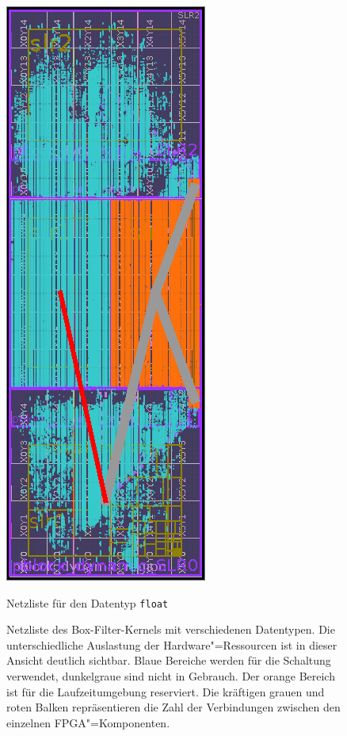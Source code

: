 \begin{figure}[htb]
\begin{minipage}{0.45\textwidth}
        \includegraphics{box_res_float.png}
        \caption*{Netzliste für den Datentyp \texttt{float}}
    \end{minipage}
    \caption[Netzliste des synthetisierten Box-Filter-\textit{Kernels} mit
             verschiedenen Datentypen]{Netzliste des Box-Filter-Kernels mit
             verschiedenen Datentypen. Die unterschiedliche Auslastung der
             Hardware"=Ressourcen ist in dieser Ansicht deutlich sichtbar. Blaue
             Bereiche werden für die Schaltung verwendet, dunkelgraue sind nicht
             in Gebrauch. Der orange Bereich ist für die Laufzeitumgebung
             reserviert. Die kräftigen grauen und roten Balken repräsentieren
             die Zahl der Verbindungen zwischen den einzelnen
             FPGA"=Komponenten.}
    \label{ergebnisse:box:messung:netzliste}
\end{figure}

